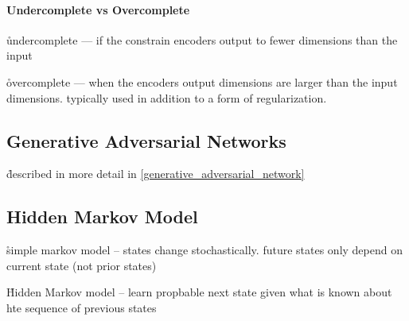 \paragraph{Undercomplete vs Overcomplete}
\r{undercomplete --- if the constrain encoders output to fewer dimensions than the input}

\r{overcomplete --- when the encoders output dimensions are larger than the input dimensions. typically used in addition to a form of regularization.}




\subsection{Generative Adversarial Networks}

\r{described in more detail in \ref{generative_adversarial_network}}

\subsection{Hidden Markov Model}

\r{simple markov model -- states change stochastically. future states only depend on current state (not prior states)}

\r{Hidden Markov model -- learn propbable next state given what is known about hte sequence of previous states}